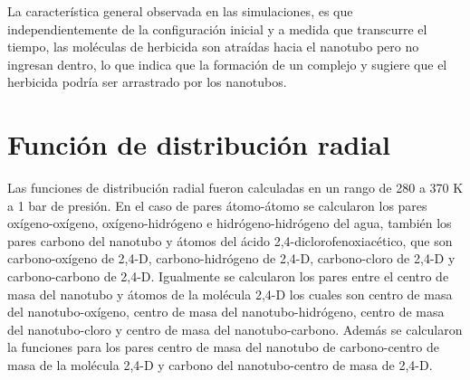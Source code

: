  La característica general observada en las simulaciones, es que independientemente de la configuración inicial y a medida que transcurre el tiempo, las moléculas de herbicida son atraídas hacia el nanotubo pero no ingresan dentro, lo que indica que la formación de un complejo y sugiere que el herbicida podría ser arrastrado por los nanotubos.

\section{Función de distribución radial}

Las funciones de distribución radial fueron calculadas en un rango de 280 a 370 K a 1 bar de presión. En el caso de pares átomo-átomo se calcularon los pares oxígeno-oxígeno, oxígeno-hidrógeno e hidrógeno-hidrógeno del agua, también los pares carbono del nanotubo y átomos del ácido 2,4-diclorofenoxiacético, que son carbono-oxígeno de 2,4-D, carbono-hidrógeno de 2,4-D, carbono-cloro de 2,4-D y carbono-carbono de 2,4-D. Igualmente se calcularon los pares entre el centro de masa del nanotubo y átomos de la molécula 2,4-D los cuales son centro de masa del nanotubo-oxígeno, centro de masa del nanotubo-hidrógeno, centro de masa del nanotubo-cloro y centro de masa del nanotubo-carbono. Además se calcularon la funciones para los pares centro de masa del nanotubo de carbono-centro de masa de la molécula 2,4-D y carbono del nanotubo-centro de masa de 2,4-D.\\

